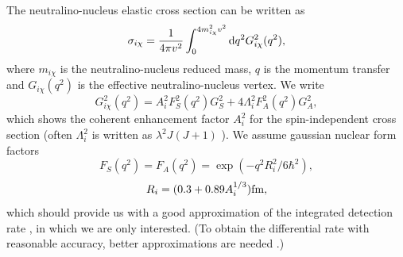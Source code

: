 \documentclass[a4paper,10pt,oneside]{book}
\begin{document}
The neutralino-nucleus elastic cross section can be written as
\begin{equation}
   \sigma_{i\chi} = {1 \over 4 \pi v^2 } \int_{0}^{4 m^2_{i\chi} v^2}
   \mbox{\rm d} q^2 G_{i\chi}^2(q^2) ,
\end{equation}
where $ m_{i\chi} $ is the neutralino-nucleus reduced mass, $q$ is the
momentum transfer and $G_{i\chi}(q^2) $ is the effective
neutralino-nucleus vertex. We write
\begin{equation}
   G^2_{i\chi}(q^2) = A_i^2 F^2_S(q^2) G_S^2 +
   4 \Lambda_i^2 F^2_A(q^2) G_A^2 ,
   \label{detrate1}
\end{equation}
which shows the coherent enhancement factor $A_i^2$ for the
spin-independent cross section
(often $ \Lambda_i^2 $ is written as $ \lambda^2 J(J+1) $ ). We assume
gaussian nuclear form factors \cite{Gould:1987ir} 
\begin{equation}
   F_S(q^2) = F_A(q^2) =
   \exp(-q^2R_i^2/6\hbar^2) ,
\end{equation}
\begin{equation}
   R_i = ( 0.3 + 0.89 A_i^{1/3} ) {\rm fm} ,
\end{equation}
which should provide us with a good approximation of the integrated
detection rate \cite{Ellis:1987sh,Ellis:1991ef}, in which we are only interested.
(To obtain the differential rate with reasonable accuracy, better
approximations are needed \cite{Engel:1991wq}.)
\end{document}
